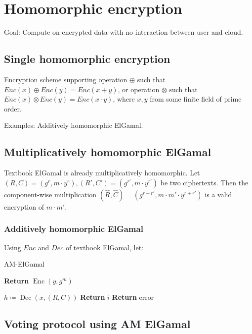 \section{Homomorphic encryption}

Goal: Compute on encrypted data with no interaction between user and cloud.

\subsection{Single homomorphic encryption}

Encryption scheme supporting operation $\oplus$ such that $Enc(x) \oplus Enc(y)
= Enc(x + y)$, or operation $\otimes$ such that $Enc(x) \otimes Enc(y) = Enc(x
\cdot y)$, where $x, y$ from some finite field of prime order.

Examples: Additively homomorphic ElGamal.

\subsection{Multiplicatively homomorphic ElGamal}

Textbook ElGamal is already multiplicatively homomorphic. Let $(R, C) = (g^r, m
\cdot y^r), (R', C') = (g^{r'}, m \cdot y^{r'})$ be two ciphertexts. Then the
component-wise multiplication $(\hat{R}, \hat{C}) = (g^{r + r'}, m \cdot m'
\cdot y^{r + r'})$ is a valid encryption of $m \cdot m'$.

\subsubsection{Additively homomorphic ElGamal}

Using $Enc$ and $Dec$ of textbook ElGamal, let:

\begin{algorithm}
		\caption{AM-ElGamal}
		\begin{algorithmic}[0]
						\State \textbf{Return} $\operatorname{Enc}(y, g^m)$
				\EndProcedure

						\State $h \coloneqq \operatorname{Dec}(x, (R, C))$
										\State \textbf{Return} $i$
								\EndIf
						\EndFor
						\State \textbf{Return} error
				\EndProcedure
		\end{algorithmic}
\end{algorithm}

\subsection{Voting protocol using AM ElGamal}

